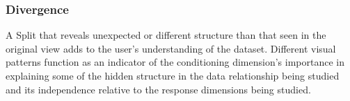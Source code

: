 \subsubsection{Divergence}

A Split that reveals unexpected or different structure than that seen in the original view adds to the user's understanding of the dataset. Different visual patterns function as an indicator of the conditioning dimension's importance in explaining some of the hidden structure in the data relationship being studied and its independence relative to the response dimensions being studied.


